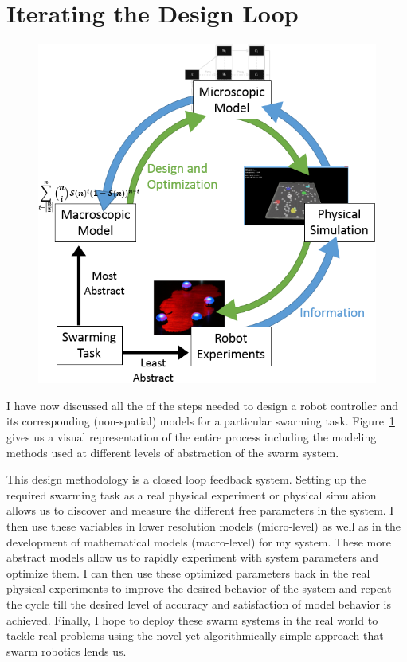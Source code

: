 \documentclass[defaultstyle,12pt]{proposal}
\begin{document}
\section{Iterating the Design Loop}
\begin{figure}[!ht]
\centering\includegraphics[width=15cm]{../assets/ssmodel.png}
\centering\caption{}\label{fig:recipe}
\end{figure}

I have now discussed all the of the steps needed to design a robot controller and its corresponding (non-spatial) models for a particular swarming task. Figure~\ref{fig:recipe} gives us a visual representation of the entire process including the modeling methods used at different levels of abstraction of the swarm system. 

This design methodology is a closed loop feedback system. Setting up the required swarming task as a real physical experiment or physical simulation allows us to discover and measure the different free parameters in the system. I then use these variables in lower resolution models (micro-level) as well as in the development of mathematical models (macro-level) for my system. These more abstract models allow us to rapidly experiment with system parameters and optimize them. I can then use these optimized parameters back in the real physical experiments to improve the desired behavior of the system and repeat the cycle till the desired level of accuracy and satisfaction of  model behavior is achieved. Finally, I hope to deploy these swarm systems in the real world to tackle real problems using the novel yet algorithmically simple approach that swarm robotics lends us.
\end{document}
